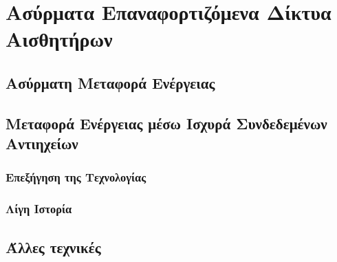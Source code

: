 

\chapter{Ασύρματα Επαναφορτιζόμενα Δίκτυα Αισθητήρων}
\label{ch:wrsns}
\section{Ασύρματη Μεταφορά Ενέργειας}
\section{Μεταφορά Ενέργειας μέσω Ισχυρά Συνδεδεμένων Αντιηχείων}
\subsection{Επεξήγηση της Τεχνολογίας}
\subsection{Λίγη Ιστορία}
\section{Άλλες τεχνικές}
